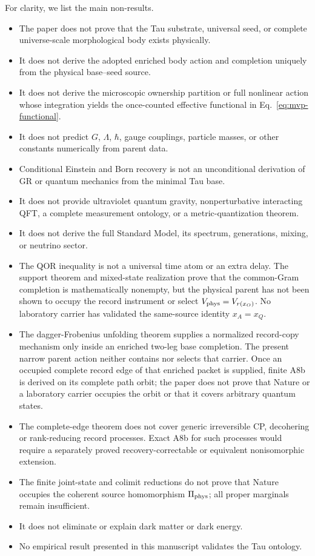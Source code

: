 \documentclass[11pt]{article}
\begin{document}
For clarity, we list the main non-results.

\begin{itemize}
  \item The paper does not prove that the Tau substrate, universal seed, or
  complete universe-scale morphological body exists physically.
  \item It does not derive the adopted enriched body action and completion
  uniquely from the physical base--seed source.
  \item It does not derive the microscopic ownership partition or full
  nonlinear action whose integration yields the once-counted effective
  functional in Eq.~\eqref{eq:mvp-functional}.
  \item It does not predict \(G\), \(\Lambda\), \(\hbar\), gauge couplings,
  particle masses, or other constants numerically from parent data.
  \item Conditional Einstein and Born recovery is not an unconditional
  derivation of GR or quantum mechanics from the minimal Tau base.
  \item It does not provide ultraviolet quantum gravity, nonperturbative
  interacting QFT, a complete measurement ontology, or a metric-quantization
  theorem.
  \item It does not derive the full Standard Model, its spectrum, generations,
  mixing, or neutrino sector.
  \item The QOR inequality is not a universal time atom or an extra delay.
  The support theorem and mixed-state realization prove that the common-Gram
  completion is mathematically nonempty, but the physical parent has not been
  shown to occupy the record instrument or select
  \(V_{\rm phys}=V_{r(x_O)}\).  No laboratory carrier has validated the
  same-source identity \(x_A=x_Q\).
  \item The dagger-Frobenius unfolding theorem supplies a normalized
  record-copy mechanism only inside an enriched two-leg base completion.  The
  present narrow parent action neither contains nor selects that carrier.
  Once an occupied complete record edge of that enriched packet is supplied,
  finite A8b is derived on its complete path orbit; the paper does not prove
  that Nature or a laboratory carrier occupies the orbit or that it covers
  arbitrary quantum states.
  \item The complete-edge theorem does not cover generic irreversible CP,
  decohering or rank-reducing record processes.  Exact A8b for such processes
  would require a separately proved recovery-correctable or equivalent
  nonisomorphic extension.
  \item The finite joint-state and colimit reductions do not prove that Nature
  occupies the coherent source homomorphism \(\Pi_{\rm phys}\); all proper
  marginals remain insufficient.
  \item It does not eliminate or explain dark matter or dark energy.
  \item No empirical result presented in this manuscript validates the Tau
  ontology.
\end{itemize}
\end{document}
